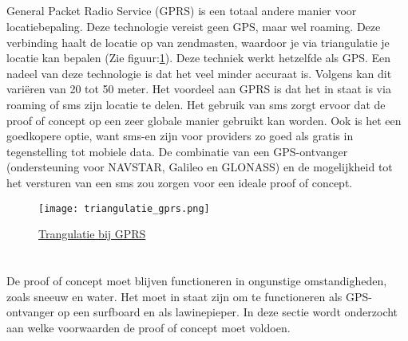 \subsection{}
General Packet Radio Service (GPRS) is een totaal andere manier voor locatiebepaling. Deze technologie vereist geen GPS, maar wel roaming. Deze verbinding haalt de locatie op van zendmasten, waardoor je via triangulatie je locatie kan bepalen (Zie figuur:\ref{fig:triangulatie_gprs}). Deze techniek werkt hetzelfde als GPS.
\newline
Een nadeel van deze technologie is dat het veel minder accuraat is. Volgens \cite{gprs} kan dit variëren van 20 tot 50 meter. Het voordeel aan GPRS is dat het in staat is via roaming of sms zijn locatie te delen. Het gebruik van sms zorgt ervoor dat de proof of concept op een zeer globale manier gebruikt kan worden. Ook is het een goedkopere optie, want sms-en zijn voor providers zo goed als gratis in tegenstelling tot mobiele data. De combinatie van een GPS-ontvanger (ondersteuning voor NAVSTAR, Galileo en GLONASS) en de mogelijkheid tot het versturen van een sms zou zorgen voor een ideale proof of concept. 
\begin{figure}
    \texttt{[image: triangulatie\_gprs.png]}
    \caption{\href{http://bigpicturequestions.com/how-does-triangulation-help-our-evolution/}{Trangulatie bij GPRS}}
    \label{fig:triangulatie_gprs}
\end{figure}
\pagebreak
\raggedbottom
\section{}
De proof of concept moet blijven functioneren in ongunstige omstandigheden, zoals sneeuw en water. Het moet in staat zijn om te functioneren als GPS-ontvanger op een surfboard en als lawinepieper. In deze sectie wordt onderzocht aan welke voorwaarden de proof of concept moet voldoen.
